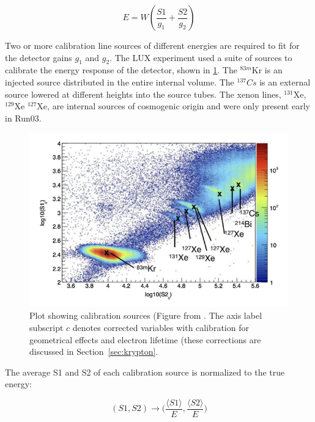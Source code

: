 \begin{equation}
E = W (\frac{S1}{g_{1}} + \frac{S2}{g_{2}})
\end{equation}

Two or more calibration line sources of different energies are required to fit for the detector gains $g_{1}$ and $g_{2}$. The \ac{LUX} experiment used a suite of sources to calibrate the energy response of the detector, shown in \ref{fig:calib_sources}. The $^{83m}$Kr is an injected source distributed in the entire internal volume. The $^{137}Cs$ is an external source lowered at different heights into the source tubes. The xenon lines, $^{131}$Xe, $^{129}$Xe $^{127}$Xe, are internal sources of cosmogenic origin and were only present early in Run03.

\begin{figure}[htbp]
\begin{center}
\includegraphics[width=\textwidth]{figures/lux/calibration_sources.png}
\caption{Plot showing calibration sources (Figure from \cite{LUX:Run03Comprehensive}. The axis label subscript $c$ denotes corrected variables with calibration for geometrical effects and electron lifetime (these corrections are discussed in Section~\ref{sec:krypton}.}
\label{fig:calib_sources}
\end{center}
\end{figure}

The average S1 and S2 of each calibration source is normalized to the true energy:

\begin{equation}
(S1, S2) \longrightarrow \Big(\frac{\langle S1 \rangle}{E}, \frac{\langle S2 \rangle}{E}\Big)
\end{equation}

